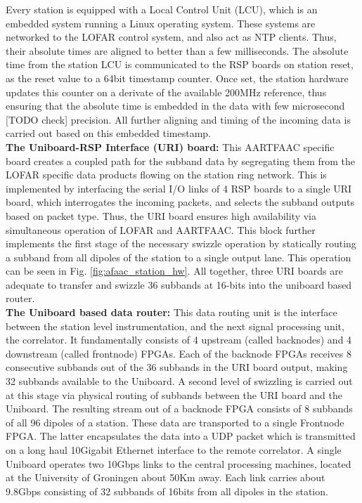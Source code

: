 \documentclass{ws-jai}
\begin{document}
Every station is equipped with a Local  Control Unit (LCU), which is an embedded
system running  a Linux operating  system.  These  systems are networked  to the
LOFAR control  system, and also act  as NTP clients. Thus,  their absolute times
are  aligned to  better than  a  few milliseconds.  The absolute  time from  the
station LCU  is communicated to  the RSP boards on  station reset, as  the reset
value to a 64bit timestamp counter.  Once set, the station hardware updates this
counter on a derivate of the  available 200MHz reference, thus ensuring that the
absolute  time  is  embedded  in  the data  with  few  microsecond  [TODO  check]
precision. All further aligning and timing  of the incoming data is carried out
based on this embedded timestamp.\\

\noindent  \textbf  {The  Uniboard-RSP  Interface (URI)  board:}  This  AARTFAAC
specific board creates  a coupled path for the subband  data by segregating them
from the LOFAR specific data products  flowing on the station ring network. This
is implemented by interfacing  the serial I/O links of 4 RSP  boards to a single
URI  board, which  interrogates the  incoming packets,  and selects  the subband
outputs based on packet type. Thus,  the URI board ensures high availability via
simultaneous operation of LOFAR and  AARTFAAC. This block further implements the
first stage of  the necessary swizzle operation by statically  routing a subband
from all dipoles of the station to  a single output lane.  This operation can be
seen  in Fig.  \ref{fig:afaac_station_hw}. All  together, three  URI boards  are
adequate to transfer and swizzle 36  subbands at 16-bits into the uniboard based
router.\\

\noindent \textbf  {The Uniboard based data  router:} This data routing  unit is
the interface  between the  station level instrumentation,  and the  next signal
processing unit, the correlator. It fundamentally consists of 4 upstream (called
backnodes) and 4 downstream (called frontnode) FPGAs. Each of the backnode FPGAs
receives 8 consecutive subbands out of the  36 subbands in the URI board output,
making 32  subbands available to  the Uniboard. A  second level of  swizzling is
carried out at this stage via physical routing of subbands between the URI board
and the  Uniboard. The  resulting stream out  of a backnode  FPGA consists  of 8
subbands of all 96 dipoles of a  station. These data are transported to a single
Frontnode FPGA.   The latter encapsulates  the data into  a UDP packet  which is
transmitted  on  a  long  haul   10Gigabit  Ethernet  interface  to  the  remote
correlator.   A  single  Uniboard  operates  two 10Gbps  links  to  the  central
processing  machines,  located  at  the   University  of  Groningen  about  50Km
away. Each link  carries about 9.8Gbps consisting of 32  subbands of 16bits from
all dipoles in the station.\\
\end{document}
